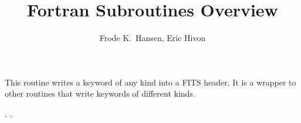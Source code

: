 
\sloppy

\title{\healpix Fortran Subroutines Overview}
 \section[add\_card]{ }
\label{sub:add_card}
\author{Frode K.~Hansen, Eric Hivon}

\begin{facility}
{This routine writes a keyword of any kind into a FITS header. It is a wrapper to other routines that write keywords of different kinds.}
{\modHeadFits}
\end{facility}

\begin{f90format}
{%
, %
, %
  }
\end{f90format}
\aboutoptional

